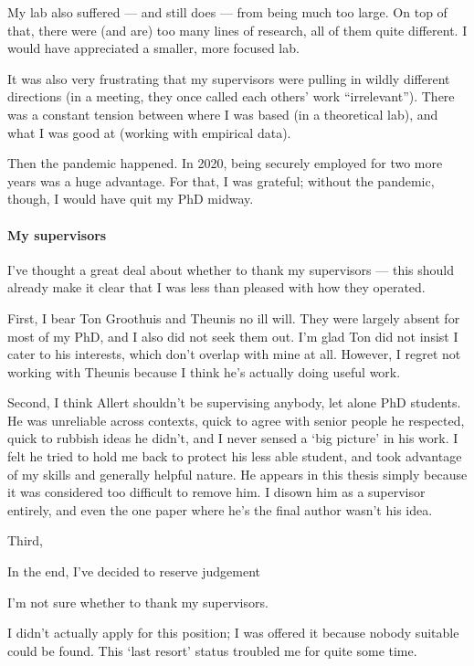 My lab also suffered --- and still does --- from being much too large. 
On top of that, there were (and are) too many lines of research, all of them quite different.
I would have appreciated a smaller, more focused lab.

It was also very frustrating that my supervisors were pulling in wildly different directions (in a meeting, they once called each others' work ``irrelevant'').
There was a constant tension between where I was based (in a theoretical lab), and what I was good at (working with empirical data).

Then the pandemic happened.
In 2020, being securely employed for two more years was a huge advantage.
For that, I was grateful; without the pandemic, though, I would have quit my PhD midway.

\paragraph*{My supervisors}

I've thought a great deal about whether to thank my supervisors --- this should already make it clear that I was less than pleased with how they operated.

First, I bear Ton Groothuis and Theunis no ill will.
They were largely absent for most of my PhD, and I also did not seek them out.
I'm glad Ton did not insist I cater to his interests, which don't overlap with mine at all.
However, I regret not working with Theunis because I think he's actually doing useful work.

Second, I think Allert shouldn't be supervising anybody, let alone PhD students.
He was unreliable across contexts, quick to agree with senior people he respected, quick to rubbish ideas he didn't, and I never sensed a `big picture' in his work.
I felt he tried to hold me back to protect his less able student, and took advantage of my skills and generally helpful nature.
He appears in this thesis simply because it was considered too difficult to remove him.
I disown him as a supervisor entirely, and even the one paper where he's the final author wasn't his idea.

Third, 


In the end, I've decided to reserve judgement

I'm not sure whether to thank my supervisors.

I didn't actually apply for this position; I was offered it because nobody suitable could be found.
This `last resort' status troubled me for quite some time.



